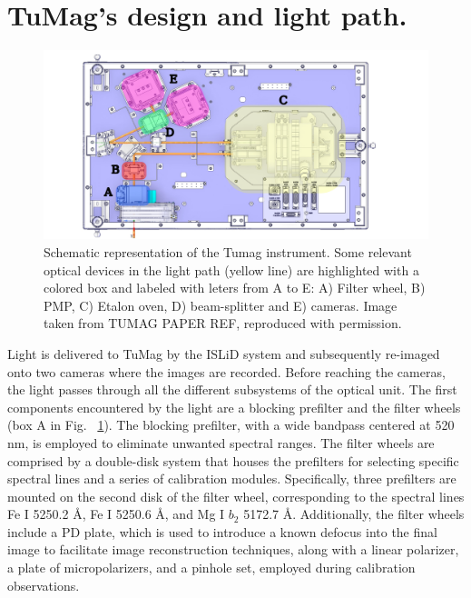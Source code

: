\section{TuMag's design and light path.}

\begin{figure}
    \includegraphics[width=\textwidth]{figures/TuMag/Scheme.pdf}
    \caption{Schematic representation of the Tumag instrument. Some relevant optical devices in the light path (yellow line) are highlighted with a colored box and labeled with leters from A to E: A) Filter wheel, B) PMP, C) Etalon oven, D) beam-splitter and E) cameras. Image taken from TUMAG PAPER REF, reproduced with permission.      
    \label{fig_tumag:scheme}}
\end{figure}

Light is delivered to TuMag by the ISLiD system and subsequently re-imaged onto two cameras where the images are recorded. Before reaching the cameras, the light passes through all the different subsystems of the optical unit. The first components encountered by the light are a blocking prefilter and the filter wheels (box A in Fig. ~\ref{fig_tumag:scheme}). The blocking prefilter, with a wide bandpass centered at 520 nm, is employed to eliminate unwanted spectral ranges. The filter wheels  are comprised by a double-disk system \citep{filter-wheels} that houses the prefilters for selecting specific spectral lines and a series of calibration modules. Specifically, three prefilters are mounted on the second disk of the filter wheel, corresponding to the spectral lines Fe I 5250.2 \r{A}, Fe I 5250.6 \r{A}, and Mg I $b_2$ 5172.7 \r{A}. Additionally, the filter wheels include a PD plate, which is used to introduce a known defocus into the final image to facilitate image reconstruction techniques, along with a linear polarizer, a plate of micropolarizers, and a pinhole set, employed during calibration observations.

